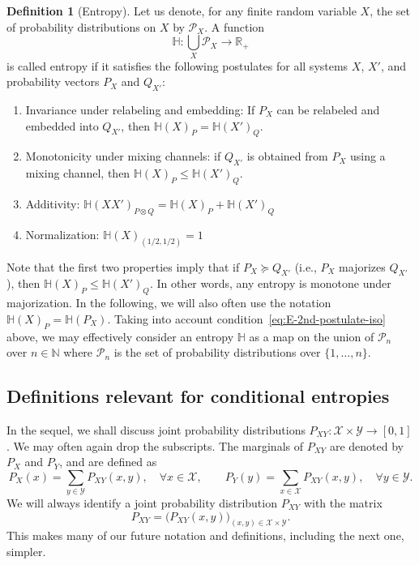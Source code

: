 \documentclass[aps,pra,11pt,onecolumn,nofootinbib,tightenlines]{revtex4-2}
\theoremstyle{definition}
\newtheorem{definition}[theorem]{Definition}
\renewcommand{\H}{\mathbb{H}}
\newcommand{\X}{\mathcal{X}}
\newcommand{\Y}{\mathcal{Y}}
\newcommand{\mc}[1]{\mathcal{#1}}
\begin{document}
\begin{definition}[Entropy]
\label{def: Entropy}
Let us denote, for any finite random variable $X$, the set of probability distributions on $X$ by $\mc P_X$. A function
\begin{equation}
\H : \bigcup_{X} \mc P_{X} \rightarrow \mathbb{R}_+
\label{eq:ent-gen-def-1st}
\end{equation}
is called entropy if it satisfies the following postulates for all systems $X$, $X'$, and probability vectors $P_{X}$ and $Q_{X'}$:
\begin{enumerate}
    \item Invariance under relabeling and embedding: If $P_X$ can be relabeled and embedded into $Q_{X'}$, then $\H(X)_P=\H(X')_Q$.
     \label{eq:E-2nd-postulate-iso}
    \item Monotonicity under mixing channels: if $Q_{X'}$ is obtained from $P_{X}$ using a mixing channel, then $ \H(X)_{P} \leq \H(X')_{Q}$.
    \label{eq:E-1st-postulate-mono}
    \item Additivity: $  \H(XX')_{P \otimes Q} = \H(X)_{P} + \H(X')_{Q}$
     \label{eq:E-2nd-postulate-add}
    \item Normalization: $ \H(X)_{(1/2,1/2)} = 1$
    \label{eq:E-4-postulate-normalization}
\end{enumerate}
\end{definition}
Note that the first two properties imply that if \(P_{X} \succeq Q_{X'}\) (i.e., \(P_X\) majorizes \(Q_{X'}\)), then \(\H(X)_P \leq \H(X')_Q\). In other words, any entropy is monotone under majorization. In the following, we will
also often use the notation $\H(X)_P=\H(P_X)$. Taking into account condition~\ref{eq:E-2nd-postulate-iso} above, we may effectively consider an entropy $\H$ as a map on the union of $\mc P_n$ over $n\in\mathbb{N}$ where $\mc P_n$ is the set of probability distributions over $\{1,\ldots,n\}$.

\subsection{Definitions relevant for conditional entropies}

In the sequel, we shall discuss joint probability distributions $P_{XY}:\X\times\Y\to[0,1]$. We may often again drop the subscripts.
The marginals of \(P_{XY}\) are denoted by \(P_X\) and \(P_Y\), and are defined as
\begin{equation}
P_X(x) = \sum_{y \in \mathcal{Y}} P_{XY}(x,y), \quad \forall x \in \mathcal{X}, \qquad
P_Y(y) = \sum_{x \in \mathcal{X}} P_{XY}(x,y), \quad \forall y \in \mathcal{Y}.
\end{equation}
We will always identify a joint probability distribution $P_{XY}$ with the matrix
\begin{equation}
P_{XY}=\big(P_{XY}(x,y)\big)_{(x,y)\in\X\times\Y}.
\end{equation}
This makes many of our future notation and definitions, including the next one, simpler.
\end{document}
